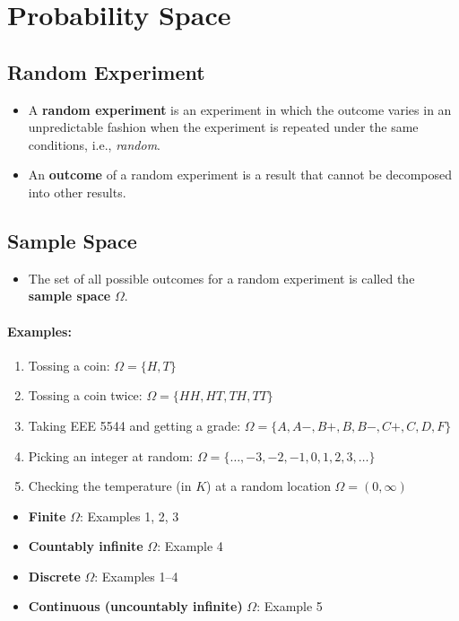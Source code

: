\section{Probability Space}

\subsection{Random Experiment}
\begin{itemize}
\item A \textbf{random experiment} is an experiment in which the
outcome varies in an unpredictable fashion when the experiment is
repeated under the same conditions, i.e., \emph{random}.
\item An \textbf{outcome} of a random experiment is a result that
cannot be decomposed into other results.
\end{itemize}

\subsection{Sample Space}
\begin{itemize}
\item The set of all possible outcomes for a random experiment is
called the \textbf{sample space} \(\Omega\).
\end{itemize}

\paragraph{Examples:}
\begin{enumerate}
\item Tossing a coin: \(\Omega=\{H, T\}\)
\item Tossing a coin twice: \(\Omega=\{H H, H T, T H, T T\}\)
\item Taking EEE 5544 and getting a grade:
\(
\Omega=\{A, A-, B+, B, B-, C+, C, D, F\}
\)
\item Picking an integer at random:
\(\Omega=\{\ldots,-3,-2,-1,0,1,2,3, \ldots \}\)
\item Checking the temperature (in $K$) at a random location
\(
\Omega=(0, \infty)
\)
\end{enumerate}

\begin{itemize}
\item \textbf{Finite} \(\Omega\): Examples 1, 2, 3
\item \textbf{Countably infinite} \(\Omega\): Example 4
\item \textbf{Discrete} \(\Omega\):  Examples 1--4
\item \textbf{Continuous (uncountably infinite)} \(\Omega\):  Example
5
\end{itemize}

